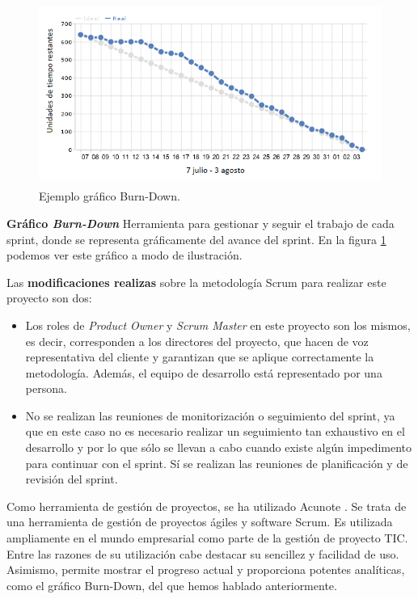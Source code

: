 \begin{figure}[t!]
\centering
\includegraphics[width=12cm,height=6cm]{figuras/burndown.png}
\caption{Ejemplo gráfico Burn-Down.}
\label{fig:burndown}
\end{figure}

\noindent
\textbf{Gráfico \textit{Burn-Down}}
Herramienta para gestionar y seguir el trabajo de cada sprint, donde se representa gráficamente del avance del sprint. En la figura \ref{fig:burndown} podemos ver este gráfico a modo de ilustración.

\noindent
Las \textbf{modificaciones realizas} sobre la metodología Scrum para realizar este proyecto son dos: 
\begin{itemize}
\item Los roles de \textit{Product Owner} y \textit{Scrum Master} en este proyecto son los mismos, es decir, corresponden a los directores del proyecto, que hacen de voz representativa del cliente y garantizan que se aplique correctamente la metodología. Además, el equipo de desarrollo está representado por una persona.
\item No se realizan las reuniones de monitorización o seguimiento del sprint, ya que en este caso no es necesario realizar un seguimiento tan exhaustivo en el desarrollo y por lo que sólo se llevan a cabo cuando existe algún impedimento para continuar con el sprint. Sí se realizan las reuniones de planificación y de revisión del sprint.
\end{itemize}

\noindent
Como herramienta de gestión de proyectos, se ha utilizado Acunote \cite{acunote}. Se trata de una herramienta de gestión de proyectos ágiles y software Scrum. Es utilizada ampliamente en el mundo empresarial como parte de la gestión de proyecto TIC. Entre las razones de su utilización cabe destacar su sencillez y facilidad de uso. Asimismo, permite mostrar el progreso actual y proporciona potentes analíticas, como el gráfico Burn-Down, del que hemos hablado anteriormente.

